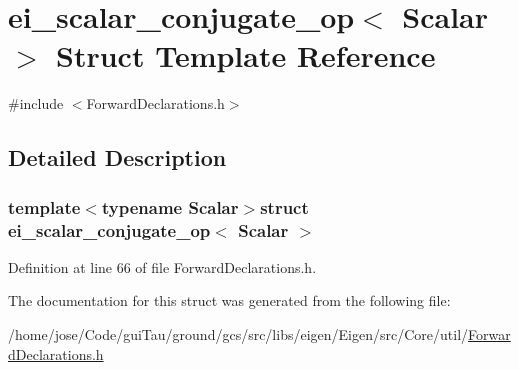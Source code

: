 \hypertarget{structei__scalar__conjugate__op}{\section{ei\-\_\-scalar\-\_\-conjugate\-\_\-op$<$ Scalar $>$ Struct Template Reference}
\label{structei__scalar__conjugate__op}
}


{\ttfamily \#include $<$Forward\-Declarations.\-h$>$}



\subsection{Detailed Description}
\subsubsection*{template$<$typename Scalar$>$struct ei\-\_\-scalar\-\_\-conjugate\-\_\-op$<$ Scalar $>$}



Definition at line 66 of file Forward\-Declarations.\-h.



The documentation for this struct was generated from the following file\-:\begin{DoxyCompactItemize}
\item 
/home/jose/\-Code/gui\-Tau/ground/gcs/src/libs/eigen/\-Eigen/src/\-Core/util/\hyperlink{_forward_declarations_8h}{Forward\-Declarations.\-h}\end{DoxyCompactItemize}
